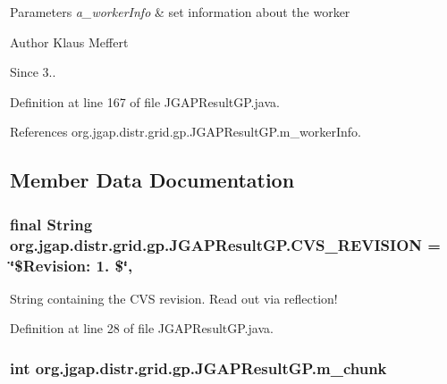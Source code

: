 \begin{DoxyParams}{Parameters}
{\em a\-\_\-worker\-Info} & set information about the worker\\
\hline
\end{DoxyParams}
\begin{DoxyAuthor}{Author}
Klaus Meffert 
\end{DoxyAuthor}
\begin{DoxySince}{Since}
3.. 
\end{DoxySince}


Definition at line 167 of file J\-G\-A\-P\-Result\-G\-P.\-java.



References org.\-jgap.\-distr.\-grid.\-gp.\-J\-G\-A\-P\-Result\-G\-P.\-m\-\_\-worker\-Info.



\subsection{Member Data Documentation}
\hypertarget{classorg_1_1jgap_1_1distr_1_1grid_1_1gp_1_1_j_g_a_p_result_g_p_afded3dd921b10ee6ba1e1b4d64762f66}{
\subsubsection[{C\-V\-S\-\_\-\-R\-E\-V\-I\-S\-I\-O\-N}]{\setlength{\rightskip}{0pt plus 5cm}final String org.\-jgap.\-distr.\-grid.\-gp.\-J\-G\-A\-P\-Result\-G\-P.\-C\-V\-S\-\_\-\-R\-E\-V\-I\-S\-I\-O\-N = \char`\"{}\$Revision\-: 1. \$\char`\"{}\hspace{0.3cm}{\ttfamily [static]}, {\ttfamily [private]}}}\label{classorg_1_1jgap_1_1distr_1_1grid_1_1gp_1_1_j_g_a_p_result_g_p_afded3dd921b10ee6ba1e1b4d64762f66}
String containing the C\-V\-S revision. Read out via reflection! 

Definition at line 28 of file J\-G\-A\-P\-Result\-G\-P.\-java.

\hypertarget{classorg_1_1jgap_1_1distr_1_1grid_1_1gp_1_1_j_g_a_p_result_g_p_a2c3e58a5c76be22b4b89951a5bf5556a}{
\subsubsection[{m\-\_\-chunk}]{\setlength{\rightskip}{0pt plus 5cm}int org.\-jgap.\-distr.\-grid.\-gp.\-J\-G\-A\-P\-Result\-G\-P.\-m\-\_\-chunk\hspace{0.3cm}{\ttfamily [private]}}}\label{classorg_1_1jgap_1_1distr_1_1grid_1_1gp_1_1_j_g_a_p_result_g_p_a2c3e58a5c76be22b4b89951a5bf5556a}


